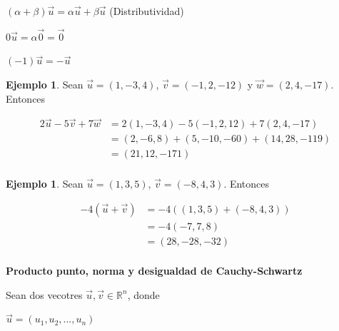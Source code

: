 \documentclass{article}
\theoremstyle{plain}
\theoremstyle{definition}
\newtheorem{ejem}[thm]{Ejemplo}
\begin{document}
\begin{center}
$(\alpha+\beta)\overrightarrow{u} = \alpha \overrightarrow{u} + \beta \overrightarrow{u}$ (Distributividad)
\end{center}

\begin{center}
$ 0 \overrightarrow{u} = \alpha \overrightarrow{0} = \overrightarrow{0}$
\end{center}

\begin{center}
$ (-1)\overrightarrow{u} = -\overrightarrow{u} $
\end{center}


\begin{ejem}Sean $\overrightarrow{u}=(1,-3,4)$, $\overrightarrow{v}=(-1,2,-12)$ y $\overrightarrow{w} = (2,4,-17)$. Entonces
\end{ejem}

\begin{align*}
2\overrightarrow{u}-5\overrightarrow{v}+7\overrightarrow{w} &= 2(1,-3,4)-5(-1,2,12)+7(2,4,-17) \\
&= (2,-6,8)+(5,-10,-60)+(14,28,-119) \\
&= (21,12,-171) \\
\end{align*}


\begin{ejem}Sean $\overrightarrow{u}=(1, 3, 5)$, $\overrightarrow{v}=(-8,4,3)$. Entonces
\end{ejem}

\begin{align*}
-4(\overrightarrow{u}+\overrightarrow{v}) &= -4( (1,3,5)+(-8,4,3)) \\
&= -4(-7,7,8) \\
&= (28,-28,-32) \\
\end{align*}





\newpage


\begin{center}
\textbf{\large{Producto punto, norma y desigualdad de Cauchy-Schwartz}} \\
\end{center}

Sean dos vecotres $\overrightarrow{u},\overrightarrow{v} \in \mathbb{R}^n$, donde

\begin{center}
$\overrightarrow{u} = (u_1,u_2,... ,u_n)$
\end{center}
\end{document}
